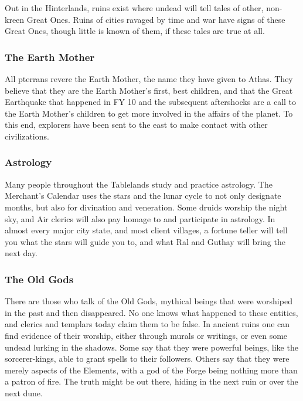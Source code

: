 Out in the Hinterlands, ruins exist where undead will tell tales of other, non-kreen Great Ones. Ruins of cities ravaged by time and war have signs of these Great Ones, though little is known of them, if these tales are true at all.

\subsubsection{The Earth Mother}
All pterrans revere the Earth Mother, the name they have given to Athas. They believe that they are the Earth Mother's first, best children, and that the Great Earthquake that happened in FY 10 and the subsequent aftershocks are a call to the Earth Mother's children to get more involved in the affairs of the planet. To this end, explorers have been sent to the east to make contact with other civilizations.

\subsubsection{Astrology}
Many people throughout the Tablelands study and practice astrology. The Merchant's Calendar uses the stars and the lunar cycle to not only designate months, but also for divination and veneration. Some druids worship the night sky, and Air clerics will also pay homage to and participate in astrology. In almost every major city state, and most client villages, a fortune teller will tell you what the stars will guide you to, and what Ral and Guthay will bring the next day.

\subsubsection{The Old Gods}
There are those who talk of the Old Gods, mythical beings that were worshiped in the past and then disappeared. No one knows what happened to these entities, and clerics and templars today claim them to be false. In ancient ruins one can find evidence of their worship, either through murals or writings, or even some undead lurking in the shadows. Some say that they were powerful beings, like the sorcerer-kings, able to grant spells to their followers. Others say that they were merely aspects of the Elements, with a god of the Forge being nothing more than a patron of fire. The truth might be out there, hiding in the next ruin or over the next dune.